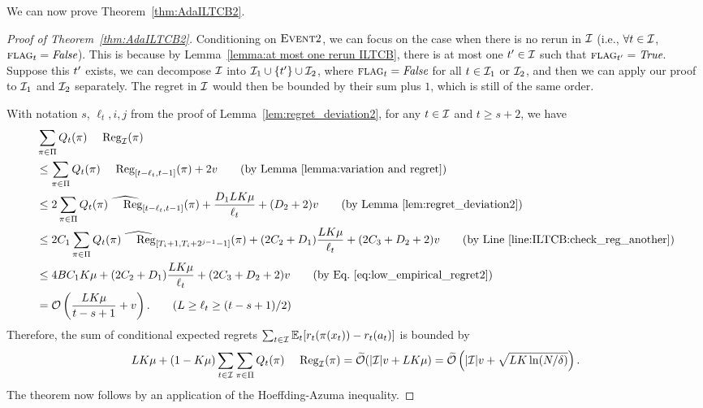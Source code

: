 We can now prove Theorem~\ref{thm:AdaILTCB2}.

\begin{proof}[Proof of Theorem~\ref{thm:AdaILTCB2}]
Conditioning on $\textsc{Event} 2$, we can focus on the case when there is no rerun in ${\mathcal{I}}$ (i.e., $\forall t\in{\mathcal{I}}$, $\textsc{flag}_t=\textit{False}$). This is because by Lemma~\ref{lemma:at most one rerun ILTCB}, there is at most one $t^\prime\in{\mathcal{I}}$ such that $\textsc{flag}_{t^\prime}=\textit{True}$. Suppose this $t^\prime$ exists, we can decompose ${\mathcal{I}}$ into ${\mathcal{I}}_1\cup\{t^\prime\}\cup{\mathcal{I}}_2$, where $\textsc{flag}_t=\textit{False}$ for all $t\in{\mathcal{I}}_1$ or ${\mathcal{I}}_2$, and then we can apply our proof to ${\mathcal{I}}_1$ and ${\mathcal{I}}_2$ separately. The regret in ${\mathcal{I}}$ would then be bounded by their sum plus $1$, which is still of the same order. 

With notation $s$, $\ell_t, i, j$ from the proof of Lemma~\ref{lem:regret_deviation2},
for any $t \in {\mathcal{I}}$ and $t \geq s+2$,
we have
%
\begin{align*}
&\sum_{\pi \in \Pi} Q_t(\pi) \Reg_\calI(\pi) \\
&\leq \sum_{\pi \in \Pi} Q_t(\pi) \Reg_{[t-\ell_t, t-1]}(\pi)  + 2v  \tag{by Lemma~\ref{lemma:variation and regret}} \\
&\leq 2 \sum_{\pi \in \Pi} Q_t(\pi) \whReg_{[t-\ell_t, t-1]}(\pi)  + \frac{D_1 LK\mu}{\ell_t} + (D_2+2)v  \tag{by Lemma~\ref{lem:regret_deviation2}} \\
&\leq 2C_1 \sum_{\pi \in \Pi} Q_t(\pi) \whReg_{[T_i+1, T_i+2^{j-1}-1]}(\pi)  + (2C_2 + D_1)\frac{LK\mu}{\ell_t} + (2C_3+D_2+2)v \tag{by Line~\ref{line:ILTCB:check_reg_another}} \\
&\leq 4B C_1  K \mu +  (2C_2 + D_1)\frac{LK\mu}{\ell_t} + (2C_3+D_2+2)v \tag{by Eq.~\eqref{eq:low_empirical_regret2}} \\
&= \scO\left(\frac{LK\mu}{t-s + 1}+v\right). \tag{$L \geq \ell_t \geq (t-s+1)/2$}
\end{align*}
%
Therefore, the sum of conditional expected regrets $\sum_{t \in {\mathcal{I}}} \mathbb{E}_t[ r_t(\pi(x_t)) - r_t(a_t)]$ is bounded by
%
\begin{align*}
LK\mu + (1-K\mu)\sum_{t\in \calI} \sum_{\pi \in \Pi} Q_t(\pi) \Reg_\calI(\pi)
= \otil(\abs{\calI}v+LK\mu) = \otil\left(\abs{\calI}v+\sqrt{LK\ln(N/\delta)}\right).
\end{align*}
%
The theorem now follows by an application of the Hoeffding-Azuma inequality.
\end{proof}